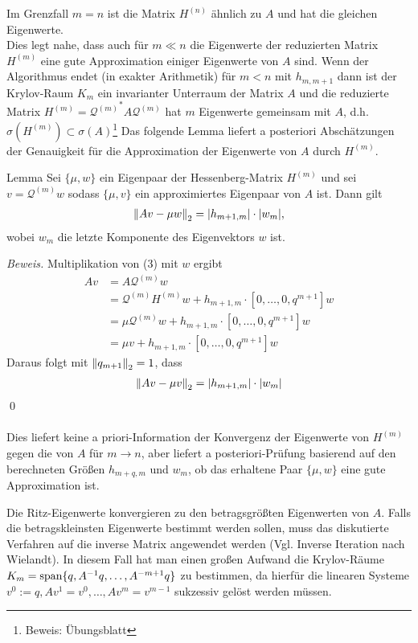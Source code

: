 Im Grenzfall $m=n$ ist die Matrix $H^{(n)}$ ähnlich zu $A$ und hat die gleichen Eigenwerte. \\
Dies legt nahe, dass auch für $m\ll n$ die Eigenwerte der reduzierten Matrix $H^{(m)}$ eine gute Approximation 
einiger Eigenwerte von $A$ sind. Wenn der Algorithmus endet (in exakter Arithmetik) für $m<n$ mit $h_{m,m+1}$ dann
ist der Krylov-Raum $K_m$ ein invarianter Unterraum der Matrix $A$ und die reduzierte Matrix $H^{(m)} = 
{\mathcal{Q}^{(m)}}^* A \mathcal{Q}^{(m)}$ hat $m$ Eigenwerte gemeinsam mit $A$, d.h. $\sigma(H^{(m)})\subset \sigma(A)$\footnote{Beweis: Übungsblatt}
Das folgende Lemma liefert a posteriori Abschätzungen der Genauigkeit für die Approximation der Eigenwerte von $A$ durch 
$H^{(m)}$.
\begin{thmbox}{Lemma}
  Sei $\{\mu,w\}$ ein Eigenpaar der Hessenberg-Matrix $H^{(m)}$ und sei $v=\mathcal{Q}^{(m)}w$ sodass $\{\mu,v\}$ ein 
  approximiertes Eigenpaar von $A$ ist. Dann gilt
  \begin{align*}\vertn{2}{Av-\mu w}_2 = |h_{m+1,m}|\cdot |w_m|,\end{align*} 
  wobei $w_m$ die letzte Komponente des Eigenvektors $w$ ist.
\end{thmbox}
\textit{Beweis.} Multiplikation von (3) mit $w$ ergibt 
\begin{align*}
Av &= A\mathcal{Q}^{(m)}w\\ 
&= \mathcal{Q}^{(m)}H^{(m)}w + h_{m+1,m}\cdot[0,\dots,0,q^{m+1}]w \\
&= \mu \mathcal{Q}^{(m)}w + h_{m+1,m}\cdot[0,\dots,0,q^{m+1}]w \\
&= \mu v + h_{m+1,m}\cdot[0,\dots,0,q^{m+1}]w
\end{align*}
Daraus folgt mit $\vertn{2}{q_{m+1}}_2 = 1$, dass
\begin{align*}\vertn{2}{Av-\mu v}_2 = |h_{m+1,m}|\cdot |w_m|\end{align*}
\qed \\ \\
Dies liefert keine a priori-Information der Konvergenz der Eigenwerte von $H^{(m)}$ gegen die von $A$ für $m\to n$, aber
liefert a posteriori-Prüfung basierend auf den berechneten Größen $h_{m+q,m}$ und $w_m$, ob das erhaltene Paar 
$\{\mu,w\}$ eine gute Approximation ist.
\begin{rembox}
  Die Ritz-Eigenwerte konvergieren zu den betragsgrößten Eigenwerten von $A$. Falls die betragskleinsten Eigenwerte 
  bestimmt werden sollen, muss das diskutierte Verfahren auf die inverse Matrix angewendet werden (Vgl. Inverse 
  Iteration nach Wielandt). In diesem Fall hat man einen großen Aufwand die Krylov-Räume 
  $K_m = \text{span}\{q,A^{-1}q,\dots,A^{-m+1}q\}$ zu bestimmen, da hierfür die linearen Systeme $v^0:=q, Av^1=v^0, 
  \dots, Av^m=v^{m-1}$ sukzessiv gelöst werden müssen.
\end{rembox}
